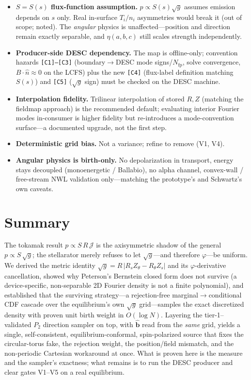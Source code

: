 \documentclass[11pt]{article}
\newcommand{\sg}{\sqrt{g}}
\newcommand{\Rs}{R_{s}}
\newcommand{\Rt}{R_{\theta}}
\newcommand{\Zs}{Z_{s}}
\newcommand{\Zt}{Z_{\theta}}
\newcommand{\bhat}{\hat{\mathbf{b}}}
\newcommand{\Nfp}{N_{\mathrm{fp}}}
\newcommand{\code}[1]{\texttt{#1}}
\begin{document}
\begin{itemize}
\item \textbf{$S=S(s)$ flux-function assumption.} $p\propto S(s)\sg$ assumes emission
depends on $s$ only. Real in-surface $T_i/n_i$ asymmetries would break it (out of
scope; noted). The \emph{angular} physics is unaffected---position and direction
remain exactly separable, and $\eta(a,b,c)$ still scales strength independently.
\item \textbf{Producer-side DESC dependency.} The map is offline-only; convention
hazards \code{[C1]--[C3]} (boundary$\to$DESC mode signs/$\Nfp$, solve convergence,
$B\!\cdot\!\hat n\!\approx\!0$ on the LCFS) plus the new \code{[C4]} (flux-label
definition matching $S(s)$) and \code{[C5]} ($\sg$ sign) must be checked on the DESC
machine.
\item \textbf{Interpolation fidelity.} Trilinear interpolation of stored $R,Z$
(matching the fieldmap approach) is the recommended default; evaluating interior
Fourier modes in-consumer is higher fidelity but re-introduces a mode-convention
surface---a documented upgrade, not the first step.
\item \textbf{Deterministic grid bias.} Not a variance; refine to remove (V1, V4).
\item \textbf{Angular physics is birth-only.} No depolarization in transport, energy
stays decoupled (monoenergetic / Ballabio), no alpha channel, convex-wall /
free-stream NWL validation only---matching the prototype's and Schwartz's own
caveats.
\end{itemize}

\section{Summary}
\label{sec:summary}

The tokamak result $p\propto S\,R\,\mathcal{J}$ is the axisymmetric shadow of the
general $p\propto S\,\sg$; the stellarator merely refuses to let $\sg$---and therefore
$\varphi$---be uniform. We derived the metric identity
$\sg=R\,|\Rs\Zt-\Rt\Zs|$ and its $\varphi$-derivative cancellation, showed why
Peterson's Bernstein closed form does not survive (a device-specific, non-separable 2D
Fourier density is not a finite polynomial), and established that the surviving
strategy---a rejection-free marginal$\to$conditional CDF cascade over the
equilibrium's own $\sg$ grid---samples the exact discretized density with proven unit
birth weight in $O(\log N)$. Layering the tier-1--validated $P_2$ direction sampler on
top, with $\bhat$ read from the \emph{same} grid, yields a single, self-consistent,
equilibrium-conformal, spin-polarized source that fixes the circular-torus fake, the
rejection weight, the position/field mismatch, and the non-periodic Cartesian
workaround at once. What is proven here is the measure and the sampler's exactness;
what remains is to run the DESC producer and clear gates V1--V5 on a real equilibrium.
\end{document}
